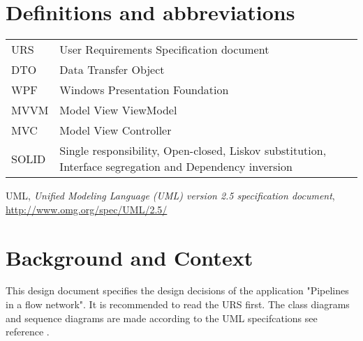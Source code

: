 \documentclass[12pt]{report}
\begin{document}

\restoregeometry 
\nopagecolor

\begingroup
\let\cleardoublepage\relax
\let\clearpage\relax

\section*{Definitions and abbreviations}
\begin{longtable}[l]{p{50pt} p{350pt}} 
URS & User Requirements Specification document\\ 
DTO & Data Transfer Object\\ 
WPF & Windows Presentation Foundation\\ 
MVVM & Model View ViewModel\\ 
MVC & Model View Controller\\
SOLID & Single responsibility, Open-closed, Liskov substitution, Interface segregation and Dependency inversion\\
\end{longtable}

\begin{thebibliography}{9}
	
	UML,
	\emph{Unified Modeling Language (UML) version 2.5 specification document}, \url{http://www.omg.org/spec/UML/2.5/}
	
\end{thebibliography}

\section*{Background and Context}
This design document specifies the design decisions of the application "Pipelines in a flow network". It is recommended to read the URS first. The class diagrams and sequence diagrams are made according to the UML specifcations see reference \cite{bib:uml}.

\tableofcontents
\endgroup




\end{document}
